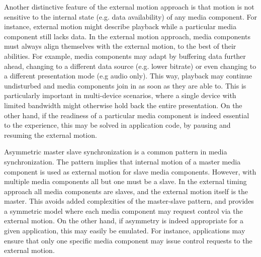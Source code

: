 \documentclass[graybox]{svmult}
\begin{document}

Another distinctive feature of the external motion approach is that motion is
not sensitive to the internal state (e.g. data availability) of any media
component. For instance, external motion might describe playback while a
particular media component still lacks data. In the external motion approach,
media components must always align themselves with the external motion, to the
best of their abilities. For example, media components may adapt by buffering
data further ahead, changing to a different data source (e.g. lower bitrate)
or even changing to a different presentation mode (e.g audio only). This way,
playback may continue undisturbed and media components join in as soon as they
are able to. This is particularly important in multi-device scenarios, where a
single device with limited bandwidth might otherwise hold back the entire
presentation. On the other hand, if the readiness of a particular media
component is indeed essential to the experience, this may be solved in
application code, by pausing and resuming the external motion.



Asymmetric master slave synchronization is a common pattern in media
synchronization. The pattern implies that internal motion of a master media
component is used as external motion for slave media components. However, with
multiple media components all but one must be a slave. In the external timing
approach all media components are slaves, and the external motion itself is
the master. This avoids added complexities of the master-slave  pattern, and
provides a symmetric model where each media component may request control via
the external motion. On the other hand, if asymmetry is indeed appropriate for
a given application, this may easily be emulated. For instance, applications
may ensure that only one specific media component may issue control requests
to the external motion.

\end{document}
